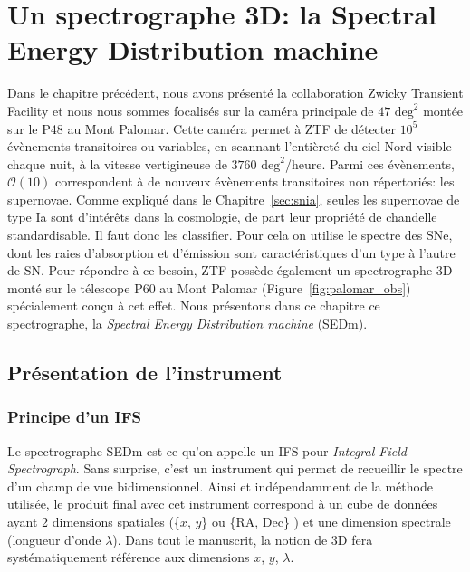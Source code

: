 \documentclass[../main/main.tex]{subfiles}
\begin{document}
\dominitoc
\faketableofcontents
\setcounter{chapter}{3}
\chapter{Un spectrographe 3D: la Spectral Energy Distribution machine}\label{ch:sedm}

\minitoc
\vspace{2cm}
Dans le chapitre précédent, nous avons présenté la collaboration Zwicky
Transient Facility et nous nous sommes focalisés sur la caméra
principale de $47\text{ deg}^{2}$ montée sur le P48 au Mont
Palomar. Cette caméra permet à ZTF de détecter $10^{5}$ évènements
transitoires ou variables, en scannant l'entièreté du ciel Nord visible
chaque nuit,  à la vitesse
vertigineuse de $3760\text{ deg}^{2}$/heure. Parmi ces évènements,
$\mathcal{O}(10)$ correspondent à de nouveux évènements transitoires non
répertoriés: les supernovae. Comme expliqué dans le
Chapitre~\ref{sec:snia}, seules les supernovae de type Ia sont
d'intérêts dans la cosmologie, de part leur propriété de chandelle
standardisable. Il faut donc les classifier. Pour cela on utilise le
spectre des SNe, dont les raies d'absorption et d'émission sont caractéristiques d'un
type à l'autre de SN. Pour répondre à ce besoin, ZTF possède également un spectrographe 3D
monté sur le télescope P60 au Mont Palomar
(Figure~\ref{fig:palomar_obs}) spécialement conçu à cet effet. Nous
présentons dans ce chapitre ce spectrographe, la \textit{Spectral Energy
Distribution machine} (SEDm).
\newpage

\section{Présentation de l'instrument}
\label{sec:ifs}

\subsection{Principe d'un IFS}
Le spectrographe SEDm est ce qu'on appelle un IFS pour \textit{Integral Field
Spectrograph}. Sans surprise, c'est un instrument qui permet de
recueillir le spectre d'un champ de vue bidimensionnel.
Ainsi et indépendamment de la méthode utilisée, le produit final avec
cet instrument correspond à
un cube de données ayant 2 dimensions spatiales (\{$x$, $y$\} ou \{RA,
Dec\} ) et une dimension spectrale (longueur d'onde $\lambda$). Dans tout le manuscrit, la notion de 3D fera
systématiquement référence aux dimensions \og $x$, $y$, $\lambda$\fg{}.
\end{document}
